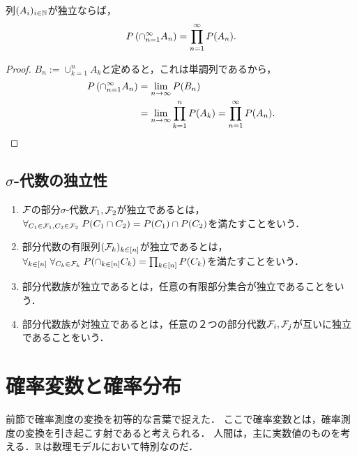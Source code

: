 \documentclass[uplatex,dvipdfmx]{jsreport}
\begin{document}
\begin{lemma}[独立事象に対する確率の関手性]\label{lemma-functority-on-independence}
    列$(A_i)_{i\in\mathbb{N}}$が独立ならば，
    \[P\left(\cap^\infty_{n=1}A_n\right)=\prod_{n=1}^\infty P(A_n).\]
\end{lemma}
\begin{proof}
    $B_n:=\cup^n_{k=1}A_k$と定めると，これは単調列であるから，
    \begin{align*}
        P\left(\cap^\infty_{n=1}A_n\right)&=\lim_{n\to\infty}P(B_n)\\
        &=\lim_{n\to\infty}\prod_{k=1}^nP(A_k)=\prod_{n=1}^\infty P(A_n).
    \end{align*}
\end{proof}

\subsection{$\sigma$-代数の独立性}

\begin{definition}\mbox{}
    \begin{enumerate}
        \item $\mathcal{F}$の部分$\sigma$-代数$\mathcal{F}_1,\mathcal{F}_2$が独立であるとは，$\forall_{C_1\in\mathcal{F}_1,C_2\in\mathcal{F}_2}\;P(C_1\cap C_2)=P(C_1)\cap P(C_2)$を満たすことをいう．
        \item 部分代数の有限列$(\mathcal{F}_k)_{k\in[n]}$が独立であるとは，$\forall_{k\in[n]}\;\forall_{C_k\in\mathcal{F}_k}\;P(\cap_{k\in[n]}C_k)=\prod_{k\in[n]}P(C_k)$を満たすことをいう．
        \item 部分代数族が独立であるとは，任意の有限部分集合が独立であることをいう．
        \item 部分代数族が対独立であるとは，任意の２つの部分代数$\mathcal{F}_i,\mathcal{F}_j$が互いに独立であることをいう．
    \end{enumerate}
\end{definition}

\section{確率変数と確率分布}

\begin{tcolorbox}[colframe=ForestGreen, colback=ForestGreen!10!white,breakable,colbacktitle=ForestGreen!40!white,coltitle=black,fonttitle=\bfseries\sffamily,
title=]
    前節で確率測度の変換を初等的な言葉で捉えた．
    ここで確率変数とは，確率測度の変換を引き起こす射であると考えられる．
    人間は，主に実数値のものを考える．$\mathbb{R}$は数理モデルにおいて特別なのだ．
\end{tcolorbox}
\end{document}
